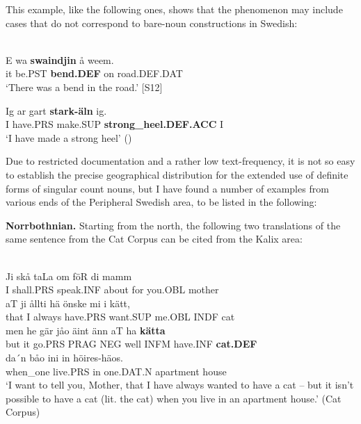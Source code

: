 \z

This example, like the following ones, shows that the phenomenon may include cases that do not correspond to bare-noun constructions in Swedish: 


\ea\label{}
\\
\gll E  wa  \textbf{swaindjin} å  weem.\\
it  be.PST  \textbf{bend.DEF} on  road.DEF.DAT\\
\glt ‘There was a bend in the road.’ [S12]

\z

\ea
\gll Ig  ar  gart  \textbf{stark-äln} ig.\\
I   have.PRS  make.SUP  \textbf{strong\_heel.DEF.ACC} I\\
\glt ‘I have made a strong heel’ (\citet[95]{Levander1909})

\z

Due to restricted documentation and a rather low text-frequency, it is not so easy to establish the precise geographical distribution for the extended use of definite forms of singular count nouns, but I have found a number of examples from various ends of the Peripheral Swedish area, to be listed in the following: 


\textbf{Norrbothnian.} Starting from the north, the following two translations of the same sentence from the Cat Corpus can be cited from the Kalix area:


\ea\label{}
\\
\gll Ji  skå  taLa  om  föR  di  mamm\\
I  shall.PRS  speak.INF  about  for  you.OBL  mother\\
\gll aT  ji  ållti  hä  önske  mi  i  kätt,\\
that  I  always  have.PRS  want.SUP  me.OBL  INDF  cat\\
\gll men  he  gär  jåo  äint  änn  aT  ha  \textbf{kätta}\\
but  it  go.PRS  PRAG  NEG  well  INFM  have.INF  \textbf{cat.DEF}\\
\gll da´n  båo  ini  in  höires-häos.\\
when\_one  live.PRS  in  one.DAT.N  apartment house\\
\glt ‘I want to tell you, Mother, that I have always wanted to have a cat – but it isn’t possible to have a cat (lit. the cat) when you live in an apartment house.’ (Cat Corpus)

